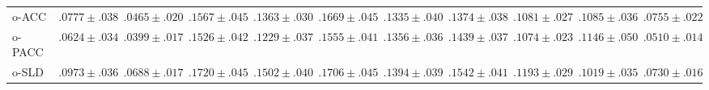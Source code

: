 \begin{tabular}{lcccccccccc}
  o-ACC & ${.0777 \pm .038}$ & ${.0465 \pm .020}$ & ${.1567 \pm .045}$ & ${.1363 \pm .030}$ & ${.1669 \pm .045}$ & ${.1335 \pm .040}$ & $\mathbf{.1374 \pm .038}$ & $\mathbf{.1081 \pm .027}$ & ${.1085 \pm .036}$ & ${.0755 \pm .022}$ \\
  o-PACC & $\mathbf{.0624 \pm .034}$ & $\mathbf{.0399 \pm .017}$ & $\mathbf{.1526 \pm .042}$ & $\mathbf{.1229 \pm .037}$ & $\mathbf{.1555 \pm .041}$ & ${.1356 \pm .036}$ & ${.1439 \pm .037}$ & $\mathbf{.1074 \pm .023}$ & ${.1146 \pm .050}$ & $\mathbf{.0510 \pm .014}$ \\
  o-SLD & ${.0973 \pm .036}$ & ${.0688 \pm .017}$ & ${.1720 \pm .045}$ & ${.1502 \pm .040}$ & ${.1706 \pm .045}$ & ${.1394 \pm .039}$ & ${.1542 \pm .041}$ & ${.1193 \pm .029}$ & ${.1019 \pm .035}$ & ${.0730 \pm .016}$ \\
  \bottomrule
\end{tabular}
